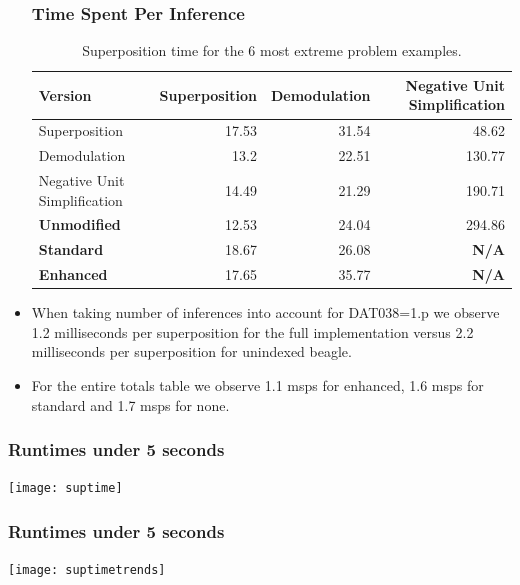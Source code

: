 \documentclass[10pt,xcolor={dvipsnames}]{beamer}
\begin{document}
\begin{NoHyper}
\begin{frame}
  \begin{itemize}
  \frametitle{Time Spent Per Inference}
 \begin{table}[H]\scriptsize
  \caption{Superposition time for the 6 most extreme problem examples.}
\begin{tabular}{| l || r | r | r |}  \hline
Version&Superposition&Demodulation&Negative Unit Simplification\\  \hline
Superposition&17.53& 31.54& 48.62\\
Demodulation&13.2& 22.51& 130.77\\
Negative Unit Simplification&14.49& 21.29& 190.71\\
\textbf{Unmodified}&12.53& 24.04& 294.86\\
\textbf{Standard}&18.67& 26.08& \textbf{N/A} \\
\textbf{Enhanced}&17.65& 35.77& \textbf{N/A}\\\hline
\end{tabular}\end{table}
  \item<2-> When taking number of inferences into account for DAT038=1.p we observe
  1.2 milliseconds per superposition for the full implementation versus 2.2 milliseconds
  per superposition for unindexed beagle.
  \item<3-> For the entire totals table we observe 1.1 msps for enhanced, 1.6 msps
  for standard and 1.7 msps for none.
  \end{itemize}
\end{frame}


\begin{frame}
  \frametitle{Runtimes under 5 seconds}
  \texttt{[image: suptime]}
\end{frame}

\begin{frame}
  \frametitle{Runtimes under 5 seconds}
  \texttt{[image: suptimetrends]}
\end{frame}



\end{NoHyper}
\end{document}
